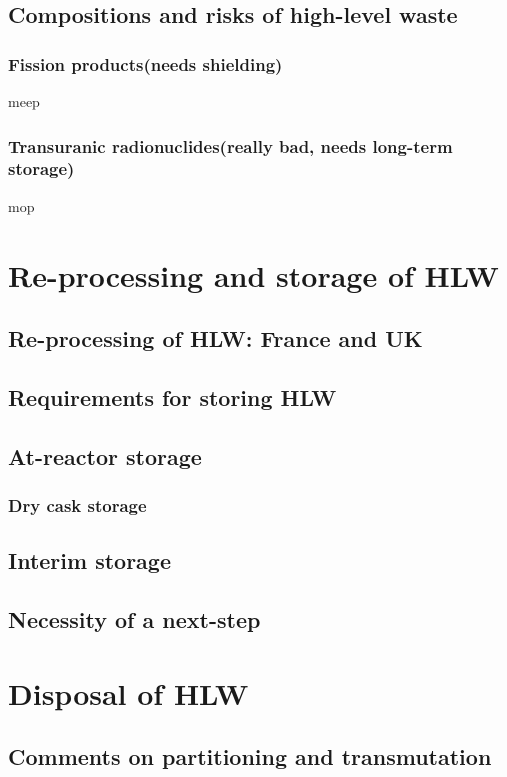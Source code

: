 \documentclass[preprint,aip,pra]{revtex4-1}
\begin{document}
    \subsection{Compositions and risks of high-level waste}
    \subsubsection{Fission products(needs shielding)}
        meep
        \subsubsection{Transuranic radionuclides(really bad, needs long-term storage)}
        mop

\section{Re-processing and storage of HLW}
    \subsection{Re-processing of HLW: France and UK}
    \subsection{Requirements for storing HLW}
    \subsection{At-reactor storage}
        \subsubsection{Dry cask storage}
    \subsection{Interim storage}
    \subsection{Necessity of a next-step}

\section{Disposal of HLW}
    \subsection{Comments on partitioning and transmutation}
\end{document}
